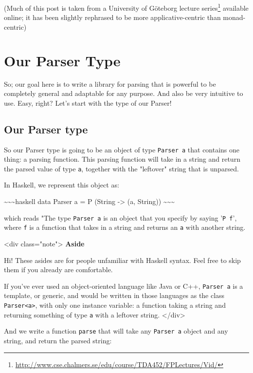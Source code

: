 \documentclass[]{article}
\renewcommand{\href}[2]{#2\footnote{\url{#1}}}
\begin{document}
(Much of this post is taken from a University of Göteborg
\href{http://www.cse.chalmers.se/edu/course/TDA452/FPLectures/Vid/}{lecture
series} available online; it has been slightly rephrased to be more
applicative-centric than monad-centric)

\section{Our Parser Type}

So; our goal here is to write a library for parsing that is powerful to be
completely general and adaptable for any purpose. And also be very intuitive to
use. Easy, right? Let's start with the type of our Parser!

\subsection{Our Parser type}

So our Parser type is going to be an object of type \texttt{Parser\ a} that
contains one thing: a parsing function. This parsing function will take in a
string and return the parsed value of type \texttt{a}, together with the
"leftover" string that is unparsed.

In Haskell, we represent this object as:

\textasciitilde{}\textasciitilde{}\textasciitilde{}haskell data Parser a = P
(String -\textgreater{} (a, String))
\textasciitilde{}\textasciitilde{}\textasciitilde{}

which reads "The type \texttt{Parser\ a} is an object that you specify by saying
'\texttt{P\ f}', where \texttt{f} is a function that takes in a string and
returns an \texttt{a} with another string.

\textless{}div class="note"\textgreater{} \textbf{Aside}

Hi! These asides are for people unfamiliar with Haskell syntax. Feel free to
skip them if you already are comfortable.

If you've ever used an object-oriented language like Java or C++,
\texttt{Parser\ a} is a template, or generic, and would be written in those
languages as the class \texttt{Parser\textless{}a\textgreater{}}, with only one
instance variable: a function taking a string and returning something of type
\texttt{a} with a leftover string. \textless{}/div\textgreater{}

And we write a function \texttt{parse} that will take any \texttt{Parser\ a}
object and any string, and return the parsed string:
\end{document}
